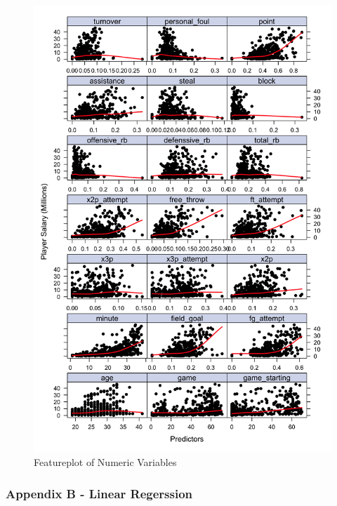\documentclass[
]{article}
\begin{document}
\begin{figure}
\centering
\includegraphics[width=\textwidth,height=0.7\textheight]{report_figures/appendixA_figure4.png}
\caption{Featureplot of Numeric Variables}
\end{figure}

\newpage

\hypertarget{appendix-b---linear-regerssion}{%
\subsubsection{Appendix B - Linear
Regerssion}\label{appendix-b---linear-regerssion}}
\end{document}

